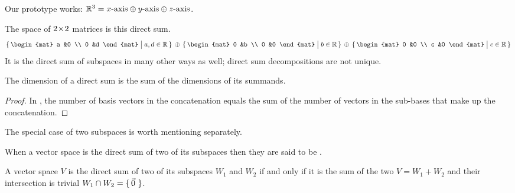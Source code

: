 \begin{example}
Our prototype works: 
$\mathbb{R}^3=\text{$x$-axis}\oplus\text{$y$-axis}\oplus\text{$z$-axis}$. 
\end{example}

\begin{example}
The space of \( 2 \! \times \! 2 \) matrices is this direct sum.
\begin{equation*}
  \set{\begin{mat}
         a  &0  \\
         0  &d
       \end{mat}  \suchthat a,d\in\Re }
  \,\mbox{}\directsum\mbox{}\,
  \set{\begin{mat}
         0  &b  \\
         0  &0
       \end{mat}  \suchthat b\in\Re }
  \,\mbox{}\directsum\mbox{}\,
  \set{\begin{mat}
         0  &0  \\
         c  &0
       \end{mat}  \suchthat c\in\Re }
\end{equation*}
It is the direct sum of subspaces in many other ways as well; 
direct sum decompositions are not unique.
\end{example}

\begin{corollary} \label{cor:DirSumDimsAdd}
The dimension of a direct sum is the sum of the dimensions of its summands.
\end{corollary}

\begin{proof}
In ,
the number of basis vectors in the concatenation equals the sum of
the number of vectors in the sub-bases that make up the concatenation.
\end{proof}

The special case of two subspaces is worth mentioning separately.

\begin{definition}
When a vector space is the direct sum of two of its subspaces then they are
said to be .%
\end{definition}

\begin{lemma}
\label{le:DirectSumTwoSp}
A vector space \( V \) is the 
direct sum
of two of its subspaces \( W_1 \) and \( W_2 \) if and only if it is the
sum of the two \( V=W_1+W_2 \) and their intersection is trivial
\( W_1\cap W_2=\mbox{$\{\,\vec{0}\,\,\}$} \).
\end{lemma}


